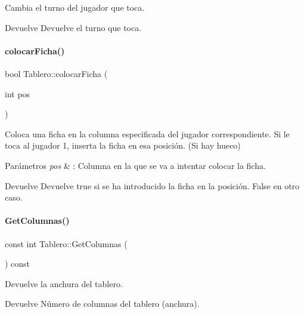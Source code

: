 Cambia el turno del jugador que toca. 

\begin{DoxyReturn}{Devuelve}
Devuelve el turno que toca. 
\end{DoxyReturn}
\hypertarget{classTablero_a24bbcc0cf0a9e464f37a261cd9c6ff45}{}\label{classTablero_a24bbcc0cf0a9e464f37a261cd9c6ff45} 
\paragraph{\texorpdfstring{colocar\+Ficha()}{colocarFicha()}}
{\footnotesize\ttfamily bool Tablero\+::colocar\+Ficha (\begin{DoxyParamCaption}\item[{int}]{pos }\end{DoxyParamCaption})}



Coloca una ficha en la columna especificada del jugador correspondiente. Si le toca al jugador 1, inserta la ficha en esa posición. (Si hay hueco) 


\begin{DoxyParams}{Parámetros}
{\em pos} & \+: Columna en la que se va a intentar colocar la ficha. \\
\hline
\end{DoxyParams}
\begin{DoxyReturn}{Devuelve}
Devuelve true si se ha introducido la ficha en la posición. False en otro caso. 
\end{DoxyReturn}
\hypertarget{classTablero_a509b0fc105dce485aefcdbd81dc452f5}{}\label{classTablero_a509b0fc105dce485aefcdbd81dc452f5} 
\paragraph{\texorpdfstring{Get\+Columnas()}{GetColumnas()}}
{\footnotesize\ttfamily const int Tablero\+::\+Get\+Columnas (\begin{DoxyParamCaption}{ }\end{DoxyParamCaption}) const\hspace{0.3cm}{\ttfamily [inline]}}



Devuelve la anchura del tablero. 

\begin{DoxyReturn}{Devuelve}
Número de columnas del tablero (anchura). 
\end{DoxyReturn}
\hypertarget{classTablero_a7d0c4ed88f099aaabad1362883b52ef1}{}\label{classTablero_a7d0c4ed88f099aaabad1362883b52ef1} 
